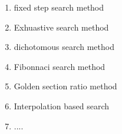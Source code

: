 \documentclass{article}
\begin{document}
\begin{enumerate}
\item fixed step search method
\item Exhuastive search method
\item dichotomous search method
\item Fibonnaci search method
\item Golden section ratio method
\item Interpolation based search
\item ....
\end{enumerate}
\end{document}
